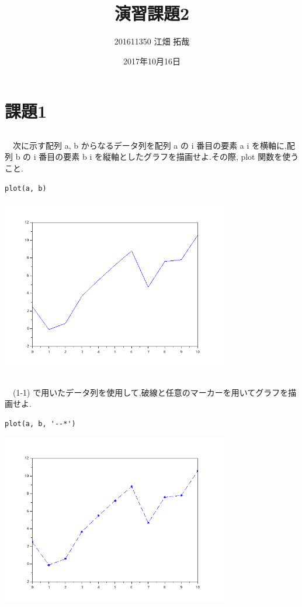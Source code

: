 \documentclass[a4j, 11pt]{jarticle}
\author{201611350 江畑 拓哉}
\date{2017年10月16日}
\title{演習課題2}
\begin{document}
\section{課題1}
\label{sec:org325f858}
\subsection{}
\label{sec:org4ef2062}
　次に示す配列 a, b からなるデータ列を配列 a の i 番目の要素 a i を横軸に,配列 b の i 番目の要素 b i を縦軸としたグラフを描画せよ.その際, plot 関数を使うこと.\\
\begin{verbatim}
plot(a, b)
\end{verbatim}

\begin{center}
\includegraphics[width=10cm]{./1-1.png}
\end{center}
\subsection{}
\label{sec:org7ee49da}
　(1-1) で用いたデータ列を使用して,破線と任意のマーカーを用いてグラフを描画せよ.\\
\begin{verbatim}
plot(a, b, '--*')
\end{verbatim}

\begin{center}
\includegraphics[width=10cm]{./1-2.png}
\end{center}
\end{document}

